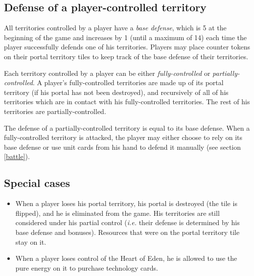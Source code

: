 \documentclass[a4paper]{article}
\begin{document}
    \subsection{Defense of a player-controlled territory}
        \label{base-defense}
        All territories controlled by a player have a \textit{base defense},
        which is 5 at the beginning of the game and increases by 1
        (until a maximum of 14)
        each time the player successfully defends one of his territories.
        Players may place counter tokens on their portal territory tiles to keep
        track of the base defense of their territories.
        
        Each territory controlled by a player can be either \textit{fully-controlled}
        or \textit{partially-controlled}.
        A player's fully-controlled territories are made up of its portal territory
        (if his portal has not been destroyed), and recursively of all of his territories
        which are in contact with his fully-controlled territories.
        The rest of his territories are partially-controlled.
        
        The defense of a partially-controlled territory is equal to its base defense.
        When a fully-controlled territory is attacked,
        the player may either choose to rely on its base defense
        or use unit cards from his hand to defend it manually (see section \ref{battle}).
        
    \subsection{Special cases}
        \begin{itemize}
            \item When a player loses his portal territory,
                     his portal is destroyed (the tile is flipped),
                     and he is eliminated from the game.
                     His territories are still considered under his partial control
                     (\textit{i.e. } their defense is determined by his base defense
                     and bonuses).
                     Resources that were on the portal territory tile stay on it.
            \item When a player loses control of the Heart of Eden,
                     he is allowed to use the pure energy on it to purchase technology cards.
        \end{itemize}
        
\newpage
\end{document}
